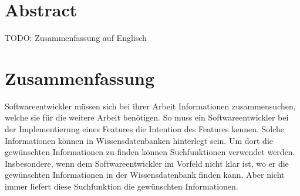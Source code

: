 %
%
%
%
%
%
%
%
\section*{Abstract}
TODO: Zusammenfassung auf Englisch

%
%
%
\section*{Zusammenfassung}
Softwareentwickler müssen sich bei ihrer Arbeit Informationen zusammensuchen, welche sie für die weitere Arbeit benötigen.
So muss ein Softwareentwickler bei der Implementierung eines Features die Intention des Features kennen.
Solche Informationen können in Wissensdatenbanken hinterlegt sein.
Um dort die gewünschten Informationen zu finden können Suchfunktionen verwendet werden.
Insbesondere, wenn dem Softwareentwickler im Vorfeld nicht klar ist, wo er die gewünschten Informationen in der Wissensdatenbank finden kann.
Aber nicht immer liefert diese Suchfunktion die gewünschten Informationen.\\

